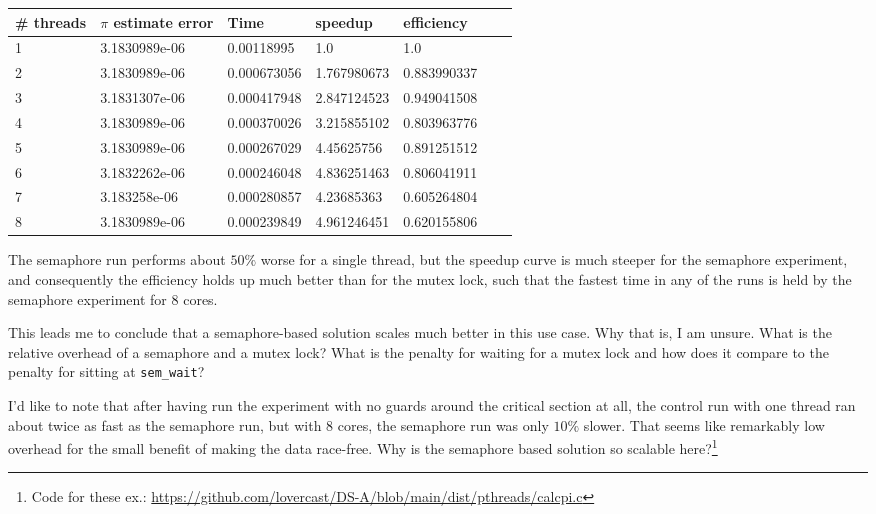 \documentclass[11pt,epsfig,letterpaper]{article}
\begin{document}
\begin{enumerate}
\begin{center}
            \vspace{0.5pc}
            \begin{tabular}{ | l | l | l | l | l | l | p{10cm} |}
            \hline
            \# threads & $\pi$ estimate error & Time & speedup & efficiency \\ \hline
            1 & 3.1830989e-06 & 0.00118995  &  1.0        & 1.0         \\ \hline
            2 & 3.1830989e-06 & 0.000673056 &  1.767980673& 0.883990337 \\ \hline
            3 & 3.1831307e-06 & 0.000417948 &  2.847124523& 0.949041508 \\ \hline
            4 & 3.1830989e-06 & 0.000370026 &  3.215855102& 0.803963776 \\ \hline
            5 & 3.1830989e-06 & 0.000267029 &  4.45625756 & 0.891251512 \\ \hline
            6 & 3.1832262e-06 & 0.000246048 &  4.836251463& 0.806041911 \\ \hline
            7 & 3.183258e-06  & 0.000280857 &  4.23685363 & 0.605264804 \\ \hline
            8 & 3.1830989e-06 & 0.000239849 &  4.961246451& 0.620155806 \\ \hline
            \end{tabular}
            \vspace{0.5pc}

            \end{center}

            \quad The semaphore run performs about $50\%$ worse for a single thread, but the speedup curve is much steeper for the semaphore experiment, and consequently the efficiency holds up much better than for the mutex lock, such that the fastest time in any of the runs is held by the semaphore experiment for 8 cores.

            \quad This leads me to conclude that a semaphore-based solution scales much better in this use case. Why that is, I am unsure. What is the relative overhead of a semaphore and a mutex lock? What is the penalty for waiting for a mutex lock and how does it compare to the penalty for sitting at {\tt sem\_wait}?

            \quad I'd like to note that after having run the experiment with no guards around the critical section at all, the control run with one thread ran about twice as fast as the semaphore run, but with 8 cores, the semaphore run was only $10\%$ slower. That seems like remarkably low overhead for the small benefit of making the data race-free. Why is the semaphore based solution so scalable here?\footnote{Code for these ex.: \url{https://github.com/lovercast/DS-A/blob/main/dist/pthreads/calcpi.c}}
            \vspace{0.5pc}


\end{enumerate}
\end{document}
